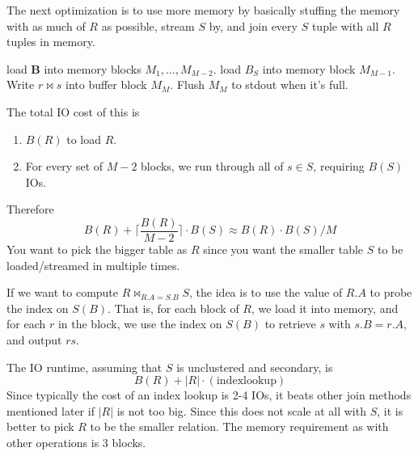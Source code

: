 \documentclass{article}
\begin{document}
      \begin{algo}
        The next optimization is to use more memory by basically stuffing the memory with as much of $R$ as possible, stream $S$ by, and join every $S$ tuple with all $R$ tuples in memory. 
        \begin{algorithm}[H]
          \begin{algorithmic}
                \State load $\mathbf{B}$ into memory blocks $M_1, \ldots, M_{M-2}$. 
                  \State load $B_S$ into memory block $M_{M-1}$. 
                      \State Write $r \bowtie s$ into buffer block $M_M$. 
                      \State Flush $M_M$ to stdout when it's full. 
                    \EndIf
                  \EndFor
                \EndFor
              \EndFor 
            \EndFunction
          \end{algorithmic}
        \end{algorithm}
        The total IO cost of this is 
        \begin{enumerate}
          \item $B(R)$ to load $R$. 
          \item For every set of $M-2$ blocks, we run through all of $s \in S$, requiring $B(S)$ IOs. 
        \end{enumerate}
        Therefore 
        \begin{equation}
          B(R) + \bigg\lceil \frac{B(R)}{M-2} \bigg\rceil \cdot B(S) \approx B(R) \cdot B(S) / M
        \end{equation}
        You want to pick the bigger table as $R$ since you want the smaller table $S$ to be loaded/streamed in multiple times. 
      \end{algo}

      \begin{algo}
        If we want to compute $R \bowtie_{R.A = S.B} S$, the idea is to use the value of $R.A$ to probe the index on $S(B)$. That is, for each block of $R$, we load it into memory, and for each $r$ in the block, we use the index on $S(B)$ to retrieve $s$ with $s.B = r.A$, and output $rs$. 

        The IO runtime, assuming that $S$ is unclustered and secondary, is 
        \begin{equation}
          B(R) + |R| \cdot (\mathrm{index lookup}) 
        \end{equation}
        Since typically the cost of an index lookup is 2-4 IOs, it beats other join methods mentioned later if $|R|$ is not too big. Since this does not scale at all with $S$, it is better to pick $R$ to be the smaller relation. The memory requirement as with other operations is $3$ blocks. 
      \end{algo}
  
\end{document}
